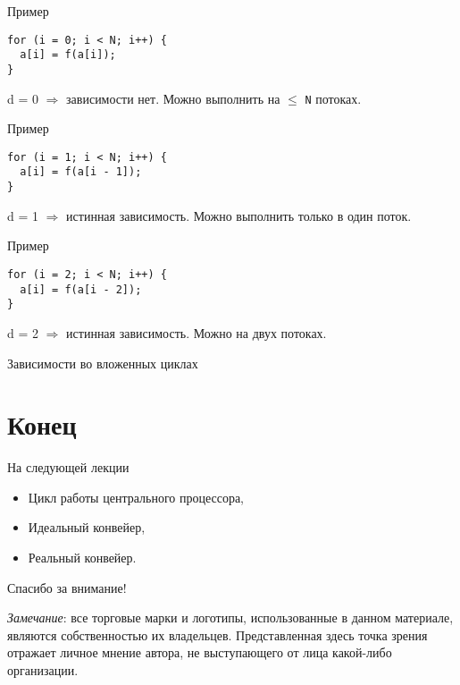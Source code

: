 \begin{frame}[fragile]{Пример}

\begin{lstlisting}
for (i = 0; i < N; i++) {
  a[i] = f(a[i]);
}
\end{lstlisting}

\pause\bigskip

d = 0 $\Rightarrow$ зависимости нет. Можно выполнить на $\leq$ \texttt{N} потоках.
\end{frame}

\begin{frame}[fragile]{Пример}
\begin{lstlisting}
for (i = 1; i < N; i++) {
  a[i] = f(a[i - 1]);
}
\end{lstlisting}

\pause\bigskip

d = 1 $\Rightarrow$ истинная зависимость. Можно выполнить только в один поток.
\end{frame}

\begin{frame}[fragile]{Пример}
\begin{lstlisting}
for (i = 2; i < N; i++) {
  a[i] = f(a[i - 2]);
}
\end{lstlisting}

\pause\bigskip

d = 2 $\Rightarrow$ истинная зависимость. Можно на двух потоках.
\end{frame}

\begin{frame}{Зависимости во вложенных циклах}
\end{frame}

\section*{Конец}

\begin{frame}{На следующей лекции}
\begin{itemize}
\ifsbertech
    \item Цикл работы центрального процессора,
    \item Идеальный конвейер,
    \item Реальный конвейер.
\fi
\end{itemize}
\end{frame}

\begin{frame}

{\huge{Спасибо за внимание!}\par}

\vfill

\tiny{\textit{Замечание}: все торговые марки и логотипы, использованные в данном материале, являются собственностью их владельцев. Представленная здесь точка зрения отражает личное мнение автора, не выступающего от лица какой-либо организации.}

\end{frame}



